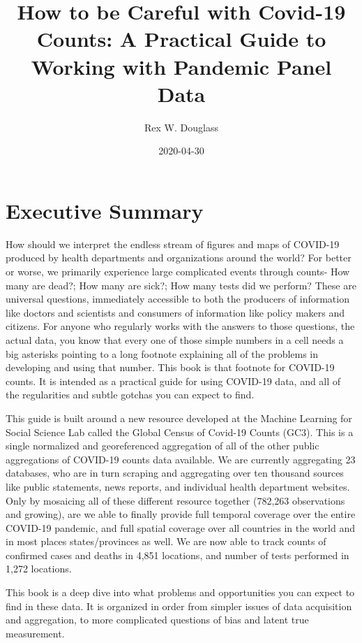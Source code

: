 \documentclass[
]{book}
\title{How to be Careful with Covid-19 Counts: A Practical Guide to Working with Pandemic Panel Data}
\author{Rex W. Douglass}
\date{2020-04-30}
\begin{document}
\maketitle

{
\setcounter{tocdepth}{1}
\tableofcontents
}
\hypertarget{intro}{%
\chapter{Executive Summary}\label{intro}}

How should we interpret the endless stream of figures and maps of COVID-19 produced by health departments and organizations around the world? For better or worse, we primarily experience large complicated events through counts- How many are dead?; How many are sick?; How many tests did we perform? These are universal questions, immediately accessible to both the producers of information like doctors and scientists and consumers of information like policy makers and citizens. For anyone who regularly works with the answers to those questions, the actual data, you know that every one of those simple numbers in a cell needs a big asterisks pointing to a long footnote explaining all of the problems in developing and using that number. This book is that footnote for COVID-19 counts. It is intended as a practical guide for using COVID-19 data, and all of the regularities and subtle gotchas you can expect to find.

This guide is built around a new resource developed at the Machine Learning for Social Science Lab called the Global Census of Covid-19 Counts (GC3). This is a single normalized and georeferenced aggregation of all of the other public aggregations of COVID-19 counts data available. We are currently aggregating 23 databases, who are in turn scraping and aggregating over ten thousand sources like public statements, news reports, and individual health department websites. Only by mosaicing all of these different resource together (782,263 observations and growing), are we able to finally provide full temporal coverage over the entire COVID-19 pandemic, and full spatial coverage over all countries in the world and in most places states/provinces as well. We are now able to track counts of confirmed cases and deaths in 4,851 locations, and number of tests performed in 1,272 locations.

This book is a deep dive into what problems and opportunities you can expect to find in these data. It is organized in order from simpler issues of data acquisition and aggregation, to more complicated questions of bias and latent true measurement.
\end{document}

